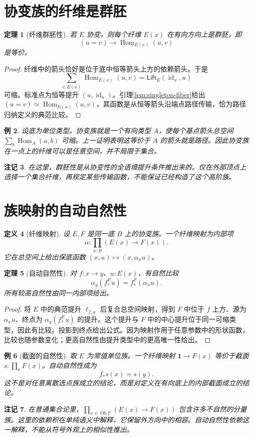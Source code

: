 \documentclass[12pt,oneside,openany,fontset=none]{ctexbook}
\theoremstyle{cn}
\newtheorem{definition}{定义}[chapter]
\newtheorem{example}[definition]{例}
\newtheorem{theorem}[definition]{定理}
\newtheorem{remark}[definition]{注记}
\numberwithin{equation}{chapter}
\newcommand{\id}{\operatorname{id}}
\newcommand{\Hom}{\operatorname{Hom}}
\newcommand{\Ob}{\operatorname{Ob}}
\newcommand{\one}{\mathbf 1}
\begin{document}
\section{协变族的纤维是群胚}
\begin{theorem}[纤维群胚性]\label{thm:covariant-groupoid}
若 $E$ 协变，则每个纤维 $E(x)$ 在有向方向上是群胚，即
\[
(u=v)\longrightarrow\Hom_{E(x)}(u,v)
\]
是等价。
\end{theorem}
\begin{proof}
纤维中的箭头恰好是位于底中恒等箭头上方的依赖箭头。于是
\[
\sum_{v:E(x)}\Hom_{E(x)}(u,v)
=\mathsf{Lift}_E(\id_x,u)
\]
可缩。标准点为恒等提升 $(u,\id_u)$。引理\ref{lem:singleton-fiber}给出
$(u=v)\simeq\Hom_{E(x)}(u,v)$，其函数是从恒等箭头沿端点路径传输，恰为路径归纳定义的典范比较。
\end{proof}
\begin{example}
设底为单位类型。协变族就是一个有向类型 $A$，使每个基点箭头总空间 $\sum_b\Hom_A(a,b)$ 可缩。上一证明表明这等价于 $A$ 的箭头就是路径。因此协变族在一点上的纤维可以是任意空间，并不局限于集合。
\end{example}
\begin{remark}
在这里，群胚性是从协变性的全语境提升条件推出来的。仅在外部顶点上选择一个集合纤维，再规定某些传输函数，不能保证已经构造了这个高阶族。
\end{remark}

\section{族映射的自动自然性}
\begin{definition}[纤维映射]
设 $E,F$ 是同一底 $B$ 上的协变族。一个纤维映射为内部项
\[
\alpha:\prod_{x:B}(E(x)\to F(x)).
\]
它在总空间上给出保底函数 $(x,u)\mapsto(x,\alpha_xu)$。
\end{definition}
\begin{theorem}[自动自然性]\label{thm:automatic-naturality}
对 $f:x\to y$、$u:E(x)$，有自然比较
\[
\alpha_y(f_*^E u)=f_*^F(\alpha_xu).
\]
所有较高自然性由同一内部项给出。
\end{theorem}
\begin{proof}
将 $E$ 中的典范提升 $\ell_{f,u}$ 后复合总空间映射，得到 $F$ 中位于 $f$ 上方、源为 $\alpha_xu$、终点为 $\alpha_y(f_*^Eu)$ 的提升。这个提升与 $F$ 中的中心提升位于同一可缩类型，因此有比较。投影到终点给出公式。因为映射作用于任意参数中的形状函数，比较也随参数变化；更高自然性由提升类型中的更高唯一性给出。
\end{proof}
\begin{example}[截面的自然性]
取 $E$ 为常值单位族。一个纤维映射 $\one\to F(x)$ 等价于截面 $s:\prod_xF(x)$。自动自然性成为
\[
f_*s(x)=s(y).
\]
这不是对任意离散选点族成立的结论，而是对定义在有向底上的内部截面成立的结论。
\end{example}
\begin{remark}
在普通集合论里，$\prod_{x\in\Ob\mathcal C}(E(x)\to F(x))$ 包含许多不自然的分量族。这里的依赖积在单纯语义中解释，它保留外方向中的相容。自动自然性依赖这一解释，不能从符号外观上的相似性推出。
\end{remark}
\end{document}
